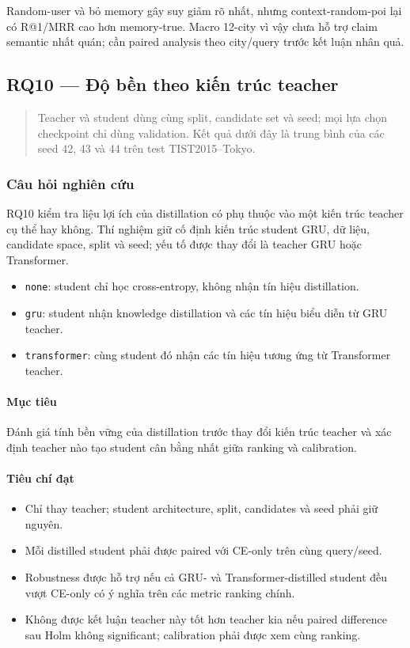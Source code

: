 Random-user và bỏ memory gây suy giảm rõ nhất, nhưng context-random-poi lại có R@1/MRR cao hơn memory-true. Macro 12-city vì vậy chưa hỗ trợ claim semantic nhất quán; cần paired analysis theo city/query trước kết luận nhân quả.


\subsection{RQ10 --- Độ bền theo kiến trúc teacher}

\begin{quote}\small Teacher và student dùng cùng split, candidate set và seed; mọi lựa chọn checkpoint chỉ dùng validation. Kết quả dưới đây là trung bình của các seed 42, 43 và 44 trên test TIST2015--Tokyo.\end{quote}
\subsubsection*{Câu hỏi nghiên cứu}

RQ10 kiểm tra liệu lợi ích của distillation có phụ thuộc vào một kiến trúc teacher cụ thể hay không. Thí nghiệm giữ cố định kiến trúc student GRU, dữ liệu, candidate space, split và seed; yếu tố được thay đổi là teacher GRU hoặc Transformer.

\begin{itemize}
\item \texttt{none}: student chỉ học cross-entropy, không nhận tín hiệu distillation.
\item \texttt{gru}: student nhận knowledge distillation và các tín hiệu biểu diễn từ GRU teacher.
\item \texttt{transformer}: cùng student đó nhận các tín hiệu tương ứng từ Transformer teacher.
\end{itemize}

\paragraph{Mục tiêu}

Đánh giá tính bền vững của distillation trước thay đổi kiến trúc teacher và xác định teacher nào tạo student cân bằng nhất giữa ranking và calibration.

\paragraph{Tiêu chí đạt}

\begin{itemize}
\item Chỉ thay teacher; student architecture, split, candidates và seed phải giữ nguyên.
\item Mỗi distilled student phải được paired với CE-only trên cùng query/seed.
\item Robustness được hỗ trợ nếu cả GRU- và Transformer-distilled student đều vượt
CE-only có ý nghĩa trên các metric ranking chính.

\item Không được kết luận teacher này tốt hơn teacher kia nếu paired difference sau
Holm không significant; calibration phải được xem cùng ranking.

\end{itemize}

